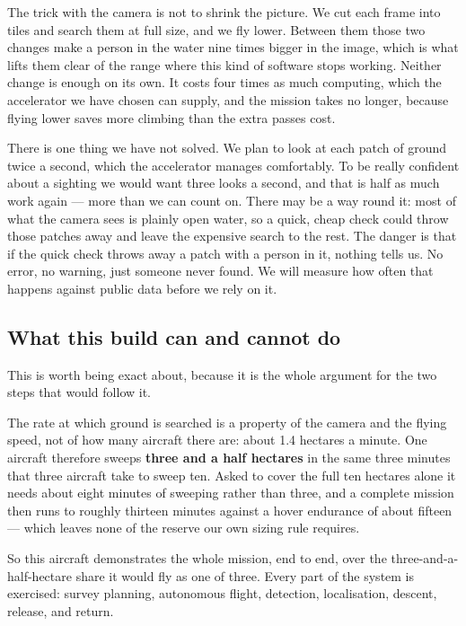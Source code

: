 \documentclass[11pt,a4paper]{article}
\begin{document}
The trick with the camera is not to shrink the picture. We cut each frame into
tiles and search them at full size, and we fly lower. Between them those two
changes make a person in the water nine times bigger in the image, which is
what lifts them clear of the range where this kind of software stops working.
Neither change is enough on its own. It costs four times as much computing,
which the accelerator we have chosen can supply, and the mission takes no
longer, because flying lower saves more climbing than the extra passes cost.

There is one thing we have not solved. We plan to look at each patch of ground
twice a second, which the accelerator manages comfortably. To be really
confident about a sighting we would want three looks a second, and that is half
as much work again --- more than we can count on. There may be a way round it:
most of what the camera sees is plainly open water, so a quick, cheap check
could throw those patches away and leave the expensive search to the rest. The
danger is that if the quick check throws away a patch with a person in it,
nothing tells us. No error, no warning, just someone never found. We will
measure how often that happens against public data before we rely on it.

\subsection{What this build can and cannot do}

This is worth being exact about, because it is the whole argument for the two
steps that would follow it.

The rate at which ground is searched is a property of the camera and the flying
speed, not of how many aircraft there are: about 1.4 hectares a minute. One
aircraft therefore sweeps \textbf{three and a half hectares} in the same three
minutes that three aircraft take to sweep ten. Asked to cover the full ten
hectares alone it needs about eight minutes of sweeping rather than three, and
a complete mission then runs to roughly thirteen minutes against a hover
endurance of about fifteen --- which leaves none of the reserve our own sizing
rule requires.

So this aircraft demonstrates the whole mission, end to end, over the
three-and-a-half-hectare share it would fly as one of three. Every part of the
system is exercised: survey planning, autonomous flight, detection,
localisation, descent, release, and return.
\end{document}
